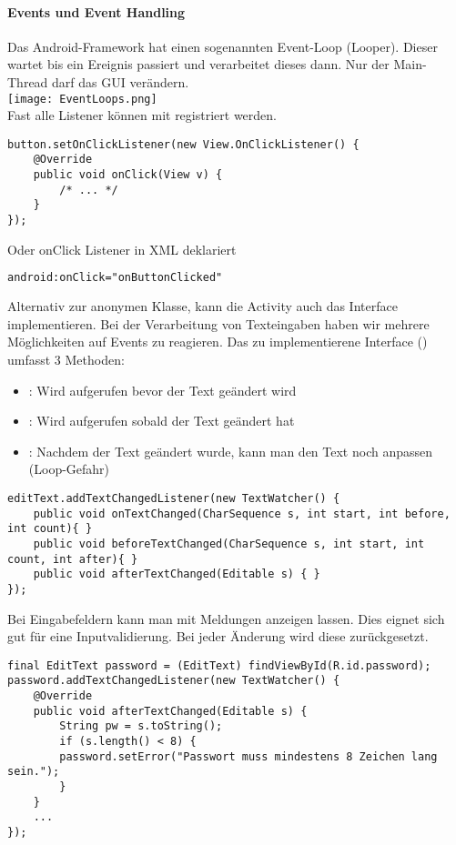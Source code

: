 \paragraph{Events und Event Handling}\label{grundlagen:eventhandling} Das Android-Framework hat einen sogenannten Event-Loop (Looper). Dieser wartet bis ein Ereignis passiert und verarbeitet dieses dann. Nur der Main-Thread darf das GUI verändern. \\
\texttt{[image: EventLoops.png]} \\
Fast alle Listener können mit  registriert werden.
\begin{lstlisting}
button.setOnClickListener(new View.OnClickListener() {
    @Override
    public void onClick(View v) {
        /* ... */
    }
});
\end{lstlisting}
Oder onClick Listener in XML deklariert
\begin{lstlisting}[language=xml]
android:onClick="onButtonClicked"
\end{lstlisting}
Alternativ zur anonymen Klasse, kann die Activity auch das Interface implementieren.
Bei der Verarbeitung von Texteingaben haben wir mehrere Möglichkeiten auf Events zu reagieren. Das zu implementierene Interface () umfasst 3 Methoden:
\begin{itemize}
\item {}: Wird aufgerufen bevor der Text geändert wird
\item {}: Wird aufgerufen sobald der Text geändert hat
\item {}: Nachdem der Text geändert wurde, kann man den Text noch anpassen (Loop-Gefahr)
\end{itemize}
\begin{lstlisting}
editText.addTextChangedListener(new TextWatcher() {
    public void onTextChanged(CharSequence s, int start, int before, int count){ }
    public void beforeTextChanged(CharSequence s, int start, int count, int after){ }
    public void afterTextChanged(Editable s) { }
});
\end{lstlisting}
Bei Eingabefeldern kann man mit  Meldungen anzeigen lassen. Dies eignet sich gut für eine Inputvalidierung. Bei jeder Änderung wird diese zurückgesetzt.
\begin{lstlisting}
final EditText password = (EditText) findViewById(R.id.password);
password.addTextChangedListener(new TextWatcher() {
    @Override
    public void afterTextChanged(Editable s) {
        String pw = s.toString();
        if (s.length() < 8) {
        password.setError("Passwort muss mindestens 8 Zeichen lang sein.");
        }
    }
    ...
});
\end{lstlisting}

